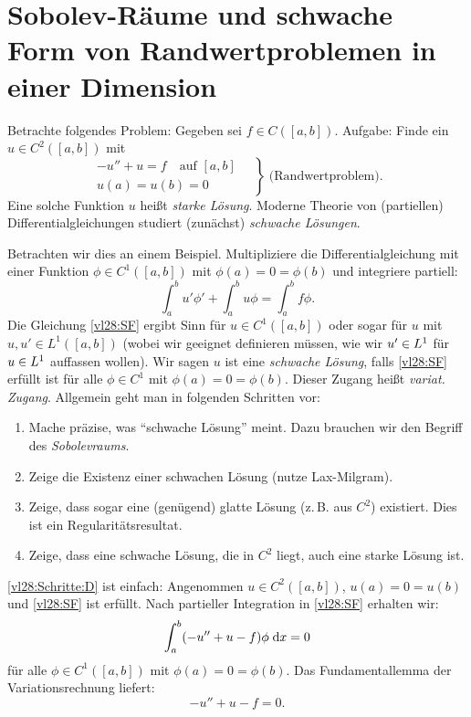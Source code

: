 \chapter{Sobolev-Räume und schwache Form
    von Randwertproblemen in einer Dimension}
\begin{thEmpty}[Motivation] \label{vl28:motivation}
    Betrachte folgendes Problem: Gegeben sei $f\in C([a,b])$. Aufgabe:
    Finde ein $u\in C^2([a,b])$ mit
    \[ \left. \begin{gathered}
            -u''+u=f  \quad \text{auf $[a,b]$} \\
            u(a) = u(b) = 0
        \end{gathered} \quad \right\} \; \text{(Randwertproblem)}
    . \]
    Eine solche Funktion $u$ heißt \emph{starke Lösung}. Moderne Theorie von
    (partiellen) Differentialgleichungen studiert (zunächst) \emph{schwache
    Lösungen}.
    
    Betrachten wir dies an einem Beispiel. Multipliziere die
    Differentialgleichung mit einer Funktion $\phi\in C^1([a,b])$ mit
    $\phi(a)=0=\phi(b)$ und integriere partiell:
    \[ \tag{SF} \label{vl28:SF}
        \int_a^b u'\phi' + \int_a^b u\phi = \int_a^b f\phi
    . \]
    Die Gleichung \eqref{vl28:SF} ergibt Sinn für $u\in C^1([a,b])$ oder sogar
    für $u$ mit $u,u'\in L^1([a,b])$ (wobei wir geeignet definieren müssen, wie
    wir $u'\in L^{1}$ für $u\in L^{1}$ auffassen wollen). Wir sagen $u$ ist eine
    \emph{schwache Lösung}, falls \eqref{vl28:SF} erfüllt ist für alle
    $\phi\in C^1$ mit $\phi(a)=0=\phi(b)$.
    Dieser Zugang heißt \emph{variat. Zugang}. Allgemein geht man in folgenden
    Schritten vor:
    \begin{enumerate}[{{Schritt~}}A, leftmargin=*] \label{vl28:Schritte}
        \item\label{vl28:Schritte:A}
            Mache präzise, was \enquote{schwache Lösung} meint. Dazu brauchen
            wir den Begriff des \emph{Sobolevraums}.
        \item\label{vl28:Schritte:B}
            Zeige die Existenz einer schwachen Lösung (nutze Lax-Milgram).
        \item\label{vl28:Schritte:C}
            Zeige, dass sogar eine (genügend) glatte Lösung (z.\,B. aus $C^2$)
            existiert. Dies ist ein Regularitätsresultat.
        \item\label{vl28:Schritte:D}
            Zeige, dass eine schwache Lösung, die in $C^2$ liegt, auch eine
            starke Lösung ist.
    \end{enumerate}
    
    \ref{vl28:Schritte:D} ist einfach: Angenommen $u\in C^2([a,b])$,
    $u(a)=0=u(b)$ und \eqref{vl28:SF} ist erfüllt. Nach partieller Integration
    in \eqref{vl28:SF} erhalten wir:
    \[ \int_a^b (-u''+u-f) \phi \;\mathrm{d} x = 0 \]
    für alle $\phi\in C^1([a,b])$ mit $\phi(a)=0=\phi(b)$. Das Fundamentallemma
    der Variationsrechnung liefert:
    \[ -u'' + u - f = 0  . \]
\end{thEmpty}

